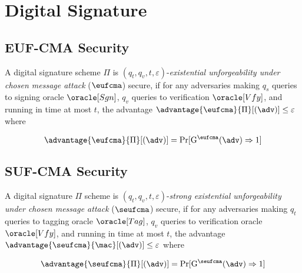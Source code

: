 \newpage
\section{Digital Signature}


\subsection{EUF-CMA Security}
A digital signature scheme $\Pi$ is $(q_t, q_v, t, \varepsilon)$-\textit{existential unforgeability under chosen message attack} ($\eufcma$) secure, if for any adversaries making $q_s$ queries to signing oracle $\oracle[Sgn]$, $q_v$ queries to verification $\oracle[Vfy]$, and running in time at most $t$, the advantage $\advantage{\eufcma}{\Pi}[(\adv)] \leq \varepsilon$ where 

$$
\advantage{\eufcma}{\Pi}[(\adv)] = \Pr[\mathrm{G}^\eufcma(\adv) \Rightarrow 1] 
$$

\subsection{SUF-CMA Security}
A digital signature $\Pi$ scheme is $(q_t, q_v, t, \varepsilon)$-\textit{strong existential unforgeability under chosen message attack} ($\seufcma$) secure, if for any adversaries making $q_t$ queries to tagging oracle $\oracle[Tag]$, $q_v$ queries to verification oracle $\oracle[Vfy]$, and running in time at most $t$, the advantage $\advantage{\seufcma}{\mac}[(\adv)] \leq \varepsilon$ where

$$
\advantage{\seufcma}{\Pi}[(\adv)] = \Pr[\mathrm{G}^\seufcma(\adv) \Rightarrow 1] 
$$

